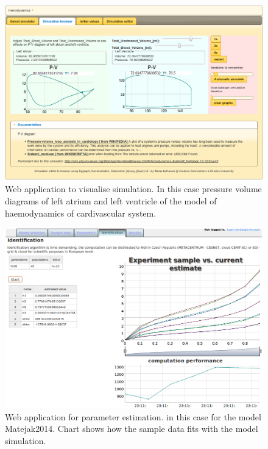 \begin{figure}[htb]
    \centering
    \includegraphics[width=1\textwidth]{chapter7/sim-physiovalues.png}
    \caption{Web application to visualise simulation. In this case pressure volume diagrams of left atrium and left ventricle of the model of haemodynamics of cardivascular system.}
    \label{fig:sim.physiovalues}
\end{figure}
\begin{figure}[htb]
    \centering
    \includegraphics[width=1\textwidth]{chapter7/app-physiovalues.png}
    \caption{Web application for parameter estimation. in this case for the model Matejak2014\cite{Matejak2014sj}. Chart shows how the sample data fits with the model simulation.}
    \label{fig:app.physiovalues}
\end{figure}

